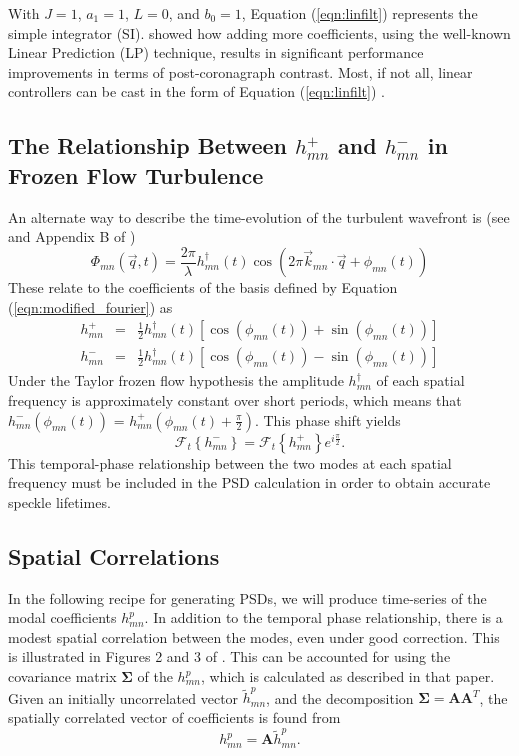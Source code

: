 \documentclass[10pt,preprint]{aastex631}
\begin{document}
With $J=1$, $a_1 = 1$, $L=0$, and $b_0 = 1$, Equation (\ref{eqn:linfilt}) represents the simple integrator (SI).  \citet{2018JATIS...4a9001M} showed how adding more coefficients, using the well-known Linear Prediction (LP) technique, results in significant performance improvements in terms of post-coronagraph contrast.  Most, if not all, linear controllers can be cast in the form of Equation (\ref{eqn:linfilt}) \citep{2007JOSAA..24.2645P, 2021arXiv210307566H}. 

\subsection{The Relationship Between $h_{mn}^+$ and $h_{mn}^-$ in Frozen Flow Turbulence}

An alternate way to describe the time-evolution of the turbulent wavefront is (see \citet{2005ApJ...629..592G} and Appendix B of \citet{2018JATIS...4a9001M})
\begin{equation}
\Phi_{mn}(\vec{q},t) = \frac{2\pi}{\lambda} h_{mn}^\dagger(t) \cos \left( 2\pi \vec{k}_{mn} \cdot \vec{q} + \phi_{mn}(t) \right)
\end{equation}
These relate to the coefficients of the basis defined by Equation (\ref{eqn:modified_fourier}) as
\begin{eqnarray}
h_{mn}^+ &=& \frac{1}{2} h_{mn}^\dagger(t) \left[ \cos(\phi_{mn}(t)) + \sin(\phi_{mn}(t))\right] \\
h_{mn}^- &=& \frac{1}{2} h_{mn}^\dagger(t) \left[ \cos(\phi_{mn}(t)) - \sin(\phi_{mn}(t))\right] \nonumber
\end{eqnarray}
Under the Taylor frozen flow hypothesis the amplitude $h_{mn}^\dagger$ of each spatial frequency is approximately constant over short periods, which means that $h_{mn}^-(\phi_{mn}(t))$ = $h_{mn}^+(\phi_{mn}(t) + \frac{\pi}{2})$.  This phase shift yields
\begin{equation}
\mathcal{F}_t\left\{h_{mn}^-\right\} = \mathcal{F}_t\left\{h_{mn}^+\right\} e^{i\frac{\pi}{2}}.
\end{equation}
This temporal-phase relationship between the two modes at each spatial frequency must be included in the PSD calculation in order to obtain accurate speckle lifetimes.

\subsection{Spatial Correlations}

In the following recipe for generating PSDs, we will produce time-series of the modal coefficients $h_{mn}^p$.  In addition to the temporal phase relationship, there is a modest spatial correlation between the modes, even under good correction.  This is illustrated in Figures 2 and 3 of \citet{2018JATIS...4a9001M}.  This can be accounted for using the covariance matrix $\pmb{\Sigma}$ of the $h_{mn}^p$, which is calculated as described in that paper.  Given an initially uncorrelated vector $\tilde{h}_{mn}^p$, and the decomposition $\pmb{\Sigma} = \pmb{A}\pmb{A}^T$, the spatially correlated vector of coefficients is found from
\begin{equation}
h_{mn}^p = \pmb{A} \tilde{h}_{mn}^p.
\end{equation}
\end{document}
